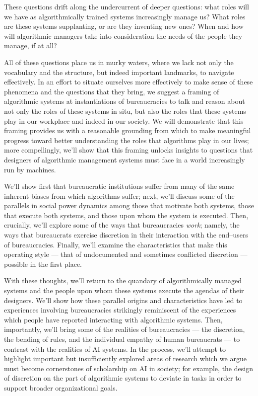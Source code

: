 \documentclass[main]{subfiles}
\begin{document}
These questions drift along the undercurrent of deeper questions: what roles will we have as algorithmically trained systems increasingly manage us?
What roles are these systems supplanting, or are they inventing new ones?
When and how will algorithmic managers take into consideration the needs of the people they manage, if at all?

All of these questions place us in murky waters, where we lack not only the vocabulary and the structure, but indeed important landmarks, to navigate effectively.
In an effort to situate ourselves more effectively to make sense of these phenomena and the questions that they bring,
we suggest a framing of algorithmic systems at instantiations of bureaucracies to talk and reason about not only the roles of these systems in situ, but also
the roles that these systems play in our workplace and indeed in our society.
We will demonstrate that this framing provides us with a reasonable grounding
from which to make meaningful progress toward better understanding the roles that algorithms play in our lives;
more compellingly, we'll show that this framing unlocks insights to questions that
designers of algorithmic management systems must face in a world increasingly run by machines.

We'll show first that bureaucratic institutions suffer from many of the same inherent biases from which algorithms suffer;
next, we'll discuss some of the parallels in social power dynamics among
those that motivate both systems,
those that execute both systems, and
those upon whom the system is executed.
Then, crucially, we'll explore
some of the ways that bureaucracies \textit{work};
namely, the ways that bureaucrats exercise discretion in their interaction with the end--users of bureaucracies.
Finally, we'll examine the characteristics that make this operating style
--- that of undocumented and sometimes conflicted discretion ---
possible in the first place.

With these thoughts, we'll return to the quandary of algorithmically managed systems and the people upon whom these systems execute the agendas of their designers.
We'll show how these parallel origins and characteristics have led to
experiences involving bureaucracies strikingly reminiscent of the experiences which people have reported interacting with algorithmic systems.
Then, importantly, we'll bring some of the realities of bureaucracies
--- the discretion, the bending of rules, and the individual empathy of human bureaucrats ---
to contrast with the realities of AI systems.
In the process, we'll attempt to highlight
important but insufficiently explored areas of research which we argue must become cornerstones of scholarship on AI in society;
for example, the design of discretion on the part of algorithmic systems
to deviate in tasks in order to support broader organizational goals.
\end{document}
